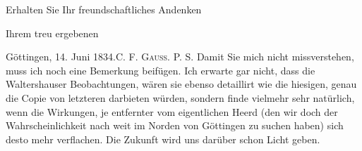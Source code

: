 Erhalten Sie Ihr freundschaftliches Andenken
\begin{flushright}Ihrem treu ergebenen\end{flushright}
\noindent\hspace*{\parindent}Göttingen, 14. Juni 1834.\hfill C. F. \textsc{Gauss}.\hspace*{3em}
\clearpage{}
\noindent\hspace*{\parindent}P. S. Damit Sie mich nicht missverstehen, muss ich noch eine Bemerkung
beifügen. Ich erwarte gar nicht, dass die Waltershauser Beobachtungen,
wären sie ebenso detaillirt wie die hiesigen, genau die Copie von letzteren
darbieten würden, sondern finde vielmehr sehr natürlich, wenn die Wirkungen,
je entfernter vom eigentlichen Heerd (den wir doch der Wahrscheinlichkeit
nach weit im Norden von Göttingen zu suchen haben) sich desto mehr verflachen.
Die Zukunft wird uns darüber schon Licht geben.
\clearpage\endgroup
